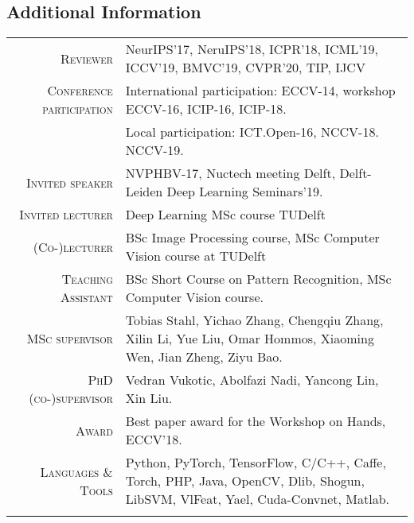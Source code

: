 \documentclass[a4paper, oneside, final]{scrartcl}
\begin{document}
\begin{center}
		\section{Additional Information}
		\begin{tabular}{r@{\hskip 0.3in}p{11.3cm}}
            \textsc{Reviewer}                   & NeurIPS'17, NeruIPS'18, ICPR'18, ICML'19, ICCV'19, BMVC'19, CVPR'20, TIP, IJCV\\
            \textsc{Conference participation}   & International participation: ECCV-14, workshop ECCV-16, ICIP-16, ICIP-18.\\ 
                                                & Local participation: ICT.Open-16, NCCV-18. NCCV-19.\\
            \textsc{Invited speaker}            & NVPHBV-17, Nuctech meeting Delft, Delft-Leiden Deep Learning Seminars'19.\\
            \textsc{Invited lecturer}           & Deep Learning MSc course TUDelft\\
			\textsc{(Co-)lecturer}		        & BSc Image Processing course, MSc Computer Vision course at TUDelft\\
            \textsc{Teaching Assistant}         & BSc Short Course on Pattern Recognition, MSc Computer Vision course.\\ 
			\textsc{MSc supervisor}             & Tobias Stahl, Yichao Zhang, Chengqiu Zhang, Xilin Li, Yue Liu, Omar Hommos, Xiaoming Wen, Jian Zheng, Ziyu Bao.\\
			\textsc{PhD (co-)supervisor}        & Vedran Vukotic, Abolfazi Nadi, Yancong Lin, Xin Liu.\\[5px] 
            \textsc{Award}                      & Best paper award for the Workshop on Hands, ECCV'18.\\  
			\textsc{Languages \& Tools}         & Python, PyTorch, TensorFlow, C\slash C++, Caffe, Torch, PHP, Java, OpenCV, Dlib, Shogun, LibSVM, VlFeat, Yael, Cuda-Convnet, Matlab.\\

			\multicolumn{2}{c}{}\\
		\end{tabular}
	\end{center}
\end{document}

